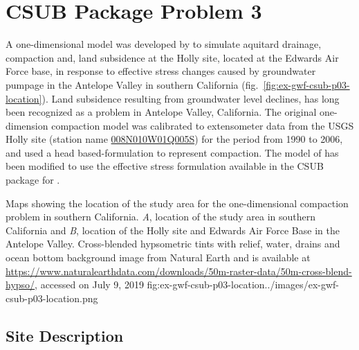 \section{CSUB Package Problem 3}

A one-dimensional \mf model was developed by \cite{sneed2008} to simulate aquitard drainage, compaction and, land subsidence at the Holly site, located at the Edwards Air Force base, in response to effective stress changes caused by groundwater pumpage in the Antelope Valley in southern California (fig.~\ref{fig:ex-gwf-csub-p03-location}). Land subsidence resulting from groundwater level declines, has long been recognized as a problem in Antelope Valley, California. The original one-dimension compaction model was calibrated to extensometer data from the USGS Holly site (station name \href{https://waterdata.usgs.gov/ca/nwis/dv/?site_no=344835117531305}{008N010W01Q005S}) for the period from 1990 to 2006, and used a head based-formulation to represent compaction. The model of \cite{sneed2008} has been modified to use the effective stress formulation available in the CSUB package for \mf.

\begin{StandardFigure}{
                                     Maps showing the location of the study area for the one-dimensional 
                                     compaction problem in southern California. \textit{A}, location of the 
                                     study area in southern California and \textit{B}, location of the Holly site and
                                     Edwards Air Force Base in the Antelope Valley. Cross-blended hypsometric 
                                     tints with relief, water, drains and ocean bottom background image from 
                                     Natural Earth and is available at 
                                     \url{https://www.naturalearthdata.com/downloads/50m-raster-data/50m-cross-blend-hypso/}, 
                                     accessed on July 9, 2019 
                                     }{fig:ex-gwf-csub-p03-location}{../images/ex-gwf-csub-p03-location.png}
\end{StandardFigure}                                 

\subsection{Site Description}

